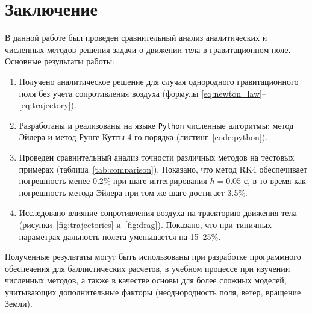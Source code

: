 \section{Заключение}

В данной работе был проведен сравнительный анализ аналитических и численных методов решения задачи о движении тела в гравитационном поле. Основные результаты работы:

\begin{enumerate}
    \item Получено аналитическое решение для случая однородного гравитационного поля без учета сопротивления воздуха (формулы \eqref{eq:newton_law}--\eqref{eq:trajectory}).
    \item Разработаны и реализованы на языке \texttt{Python} численные алгоритмы: метод Эйлера и метод Рунге-Кутты 4-го порядка (листинг~\ref{code:python}).
    \item Проведен сравнительный анализ точности различных методов на тестовых примерах (таблица~\ref{tab:comparison}). Показано, что метод RK4 обеспечивает погрешность менее 0.2\% при шаге интегрирования \(h=0.05\) с, в то время как погрешность метода Эйлера при том же шаге достигает 3.5\%.
    \item Исследовано влияние сопротивления воздуха на траекторию движения тела (рисунки~\ref{fig:trajectories} и~\ref{fig:drag}). Показано, что при типичных параметрах дальность полета уменьшается на 15--25\%.
\end{enumerate}

Полученные результаты могут быть использованы при разработке программного обеспечения для баллистических расчетов, в учебном процессе при изучении численных методов, а также в качестве основы для более сложных моделей, учитывающих дополнительные факторы (неоднородность поля, ветер, вращение Земли).